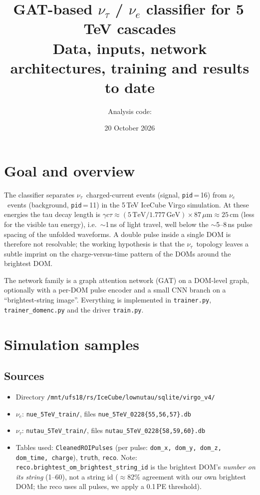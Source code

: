 \documentclass[11pt,a4paper]{article}
\title{GAT-based $\nu_\tau$ / $\nu_e$ classifier for 5\,TeV cascades\\[2pt]
\large Data, inputs, network architectures, training and results to date}
\author{Analysis code: \code{doublepulse/gnn/Analysis}}
\date{20 October 2026}
\newcommand{\nutau}{\ensuremath{\nu_\tau}}
\newcommand{\nue}{\ensuremath{\nu_e}}
\newcommand{\code}[1]{\texttt{#1}}
\begin{document}
\sloppy
\maketitle
\tableofcontents

\section{Goal and overview}
The classifier separates \nutau\ charged-current events (signal, \code{pid}\,=\,16) from \nue\ events
(background, \code{pid}\,=\,11) in the 5\,TeV IceCube Virgo simulation. At these energies the tau decay length is
$\gamma c\tau \approx (5\,\mathrm{TeV}/1.777\,\mathrm{GeV})\times 87\,\mu\mathrm{m}\approx 25$\,cm (less for the
visible tau energy), i.e.\ $\sim$1\,ns of light travel, well below the $\sim$5--8\,ns pulse spacing of the unfolded
waveforms. A double pulse inside a single DOM is therefore not resolvable; the working hypothesis is that the
\nutau\ topology leaves a subtle imprint on the charge-versus-time pattern of the DOMs around the brightest DOM.

The network family is a graph attention network (GAT) on a DOM-level graph, optionally with a per-DOM pulse encoder
and a small CNN branch on a ``brightest-string image''. Everything is implemented in
\code{trainer.py}, \code{trainer\_domenc.py} and the driver \code{train.py}.

\section{Simulation samples}
\subsection{Sources}
\begin{itemize}
  \item Directory \code{/mnt/ufs18/rs/IceCube/lownutau/sqlite/virgo\_v4/}
  \item \nue: \code{nue\_5TeV\_train/}, files \code{nue\_5TeV\_0228\{55,56,57\}.db}
  \item \nutau: \code{nutau\_5TeV\_train/}, files \code{nutau\_5TeV\_0228\{58,59,60\}.db}
  \item Tables used: \code{CleanedROIPulses} (per pulse: \code{dom\_x, dom\_y, dom\_z, dom\_time, charge}),
        \code{truth}, \code{reco}. Note: \code{reco.brightest\_om\_brightest\_string\_id} is the brightest DOM's
        \emph{number on its string} (1--60), not a string id ($\approx$82\% agreement with our own brightest DOM; the
        reco uses all pulses, we apply a 0.1\,PE threshold).
\end{itemize}
\end{document}
